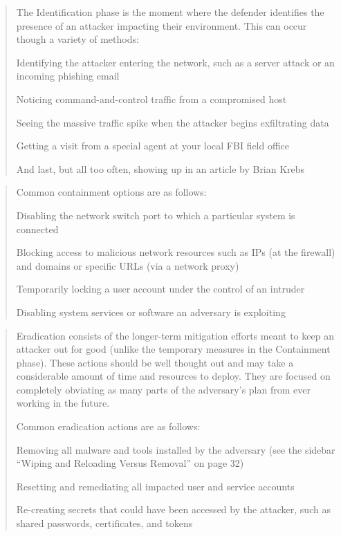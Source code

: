 \documentclass[Screen16to9,17pt]{foils}
\begin{document}


\begin{quote}
The Identification phase is the moment where the defender identifies the presence of
an attacker impacting their environment. This can occur though a variety of methods:
\begin{list2}
\item Identifying the attacker entering the network, such as a server attack or an
incoming phishing email
\item  Noticing command-and-control traffic from a compromised host
\item  Seeing the massive traffic spike when the attacker begins exfiltrating data
\item  Getting a visit from a special agent at your local FBI field office
\item  And last, but all too often, showing up in an article by Brian Krebs
\end{list2}
\end{quote}



\begin{quote}
Common containment options are as follows:
\begin{list2}
\item Disabling the network switch port to which a particular system is connected
\item  Blocking access to malicious network resources such as IPs (at the firewall) and domains or specific URLs (via a network proxy)
\item  Temporarily locking a user account under the control of an intruder
\item  Disabling system services or software an adversary is exploiting
\end{list2}
\end{quote}



\begin{quote}
Eradication consists of the longer-term mitigation efforts meant to keep an attacker
out for good (unlike the temporary measures in the Containment phase). These
actions should be well thought out and may take a considerable amount of time and
resources to deploy. They are focused on completely obviating as many parts of the
adversary’s plan from ever working in the future.

Common eradication actions are as follows:
\begin{list2}
\item Removing all malware and tools installed by the adversary (see the sidebar “Wiping and Reloading Versus Removal” on page 32)
\item Resetting and remediating all impacted user and service accounts
\item Re-creating secrets that could have been accessed by the attacker, such as shared passwords, certificates, and tokens
\end{list2}
\end{quote}
\end{document}
